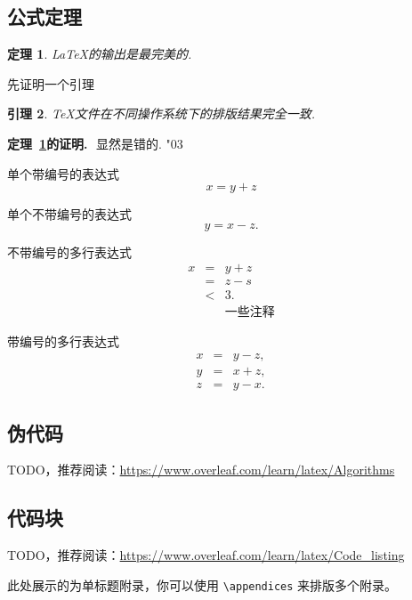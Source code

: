 \documentclass{nktba}
\newtheorem{Theorem}{\hspace{2em}定理}[section]
\newtheorem{Lemma}[Theorem]{\hspace{2em}引理}
\newenvironment{proof}[1][证明]{\par\textbf{#1.}\,\, }{\hfill{\usefont{U}{msa}{m}{n}\char"03}}
\begin{document}
\subsection{公式定理}

\begin{Theorem} \label{thm:latex}
\LaTeX 的输出是最完美的.
\end{Theorem}

先证明一个引理
\begin{Lemma} \label{thm:tex}
\TeX 文件在不同操作系统下的排版结果完全一致.
\end{Lemma}

\begin{proof}[定理~\ref{thm:latex}的证明]
显然是错的.
\end{proof}

单个带编号的表达式
\begin{equation}\label{eq:a1}
x=y+z
\end{equation}

单个不带编号的表达式
\[
y=x-z.
\]

不带编号的多行表达式
\begin{eqnarray*}
x&=&y+z \\
  &=&z-s\\
  &<& 3. \\
  && \mbox{一些注释}
\end{eqnarray*}

带编号的多行表达式
\begin{eqnarray}
  x&=& y-z, \label{eq:aa1}\\
  y&=& x+z, \nonumber \\
  z&=&y-x. \label{eq:aa2}
\end{eqnarray}

\subsection{伪代码}

TODO，推荐阅读：\url{https://www.overleaf.com/learn/latex/Algorithms}

\subsection{代码块}

TODO，推荐阅读：\url{https://www.overleaf.com/learn/latex/Code_listing}

\appendix
此处展示的为单标题附录，你可以使用 \verb|\appendices| 来排版多个附录。

\begin{reference}
\printbibliography[heading=none]
\end{reference}

\begin{acknowledgement}

\end{acknowledgement}
\end{document}
